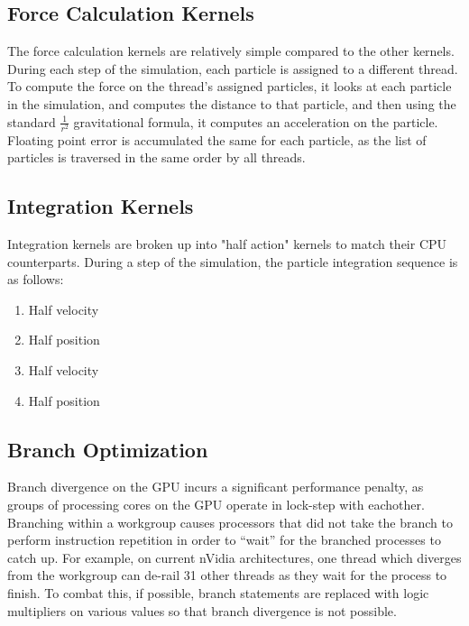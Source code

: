 \documentclass[fleqn,10pt]{SelfArx} %
\begin{document}
\subsection{Force Calculation Kernels}
The force calculation kernels are relatively simple compared to the other kernels. During each step of the simulation, each particle is assigned to a different thread. To compute the force on the thread's assigned particles, it looks at each particle in the simulation, and computes the distance to that particle, and then using the standard $\frac{1}{r^2}$ gravitational formula, it computes an acceleration on the particle. Floating point error is accumulated the same for each particle, as the list of particles is traversed in the same order by all threads.

\subsection{Integration Kernels}
Integration kernels are broken up into "half action" kernels to match their CPU counterparts. During a step of the simulation, the particle integration sequence is as follows:
\begin{enumerate}
    \setlength\itemsep{0.1pt}
    \item Half velocity
    \item Half position
    \item Half velocity
    \item Half position
\end{enumerate}

\subsection{Branch Optimization}
Branch divergence on the GPU incurs a significant performance penalty, as groups of processing cores on the GPU operate in lock-step with eachother. Branching within a workgroup causes processors that did not take the branch to perform instruction repetition in order to “wait” for the branched processes to catch up. For example, on current nVidia architectures, one thread which diverges from the workgroup can de-rail 31 other threads as they wait for the process to finish. To combat this, if possible, branch statements are replaced with logic multipliers on various values so that branch divergence is not possible.
\end{document}
